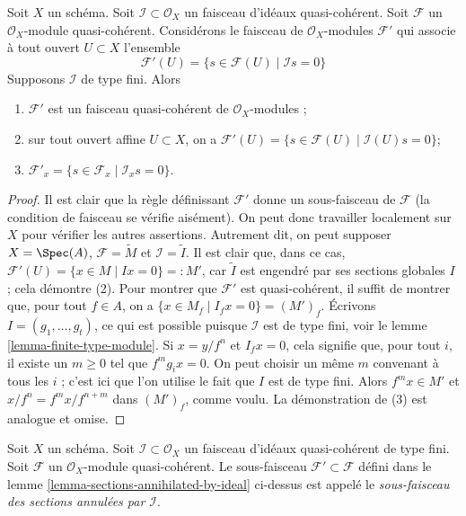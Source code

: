 \begin{lemma}
\label{lemma-sections-annihilated-by-ideal}
Soit $X$ un schéma.
Soit $\mathcal{I} \subset \mathcal{O}_X$ un faisceau d'idéaux quasi-cohérent.
Soit $\mathcal{F}$ un $\mathcal{O}_X$-module
quasi-cohérent. Considérons le faisceau de $\mathcal{O}_X$-modules $\mathcal{F}'$
qui associe à tout ouvert $U \subset X$ l'ensemble
$$
\mathcal{F}'(U)
=
\{s \in \mathcal{F}(U) \mid
\mathcal{I}s = 0\}
$$
Supposons $\mathcal{I}$ de type fini. Alors
\begin{enumerate}
\item $\mathcal{F}'$ est un faisceau quasi-cohérent de $\mathcal{O}_X$-modules ;
\item sur tout ouvert affine $U \subset X$, on a
$\mathcal{F}'(U) = \{s \in \mathcal{F}(U) \mid \mathcal{I}(U)s = 0\}$;
\item $\mathcal{F}'_x = \{s \in \mathcal{F}_x \mid \mathcal{I}_x s = 0\}$.
\end{enumerate}
\end{lemma}

\begin{proof}
Il est clair que la règle définissant $\mathcal{F}'$ donne un sous-faisceau
de $\mathcal{F}$ (la condition de faisceau se vérifie aisément). On peut donc
travailler localement sur $X$ pour vérifier les autres assertions. Autrement
dit, on peut supposer $X = \Spec(A)$, $\mathcal{F} = \widetilde{M}$
et $\mathcal{I} = \widetilde{I}$. Il est clair que, dans ce cas,
$\mathcal{F}'(U) = \{x \in M \mid Ix = 0\} =: M'$, car $\widetilde{I}$
est engendré par ses sections globales $I$ ; cela démontre (2). Pour
montrer que $\mathcal{F}'$ est quasi-cohérent, il suffit de montrer que,
pour tout $f \in A$, on a
$\{x \in M_f \mid I_f x = 0\} = (M')_f$.
Écrivons $I = (g_1, \ldots, g_t)$, ce qui est possible puisque $\mathcal{I}$
est de type fini, voir le lemme \ref{lemma-finite-type-module}.
Si $x = y/f^n$ et $I_fx = 0$, cela signifie que, pour tout $i$,
il existe un $m \geq 0$ tel que $f^mg_ix = 0$.
On peut choisir un même $m$ convenant à tous les $i$ ; c'est ici que l'on utilise
le fait que $I$ est de type fini. Alors $f^mx \in M'$
et $x/f^n = f^mx/f^{n + m}$ dans $(M')_f$, comme
voulu. La démonstration de (3) est analogue et omise.
\end{proof}

\begin{definition}
\label{definition-subsheaf-sections-annihilated-by-ideal}
Soit $X$ un schéma.
Soit $\mathcal{I} \subset \mathcal{O}_X$ un faisceau d'idéaux quasi-cohérent
de type fini.
Soit $\mathcal{F}$ un $\mathcal{O}_X$-module
quasi-cohérent. Le sous-faisceau $\mathcal{F}' \subset \mathcal{F}$ défini dans
le lemme \ref{lemma-sections-annihilated-by-ideal} ci-dessus est
appelé le {\it sous-faisceau des sections annulées par $\mathcal{I}$}.
\end{definition}

